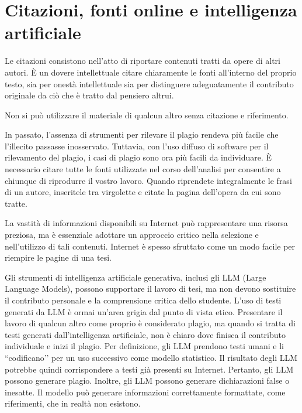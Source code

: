\documentclass{article}
\newcounter{nota}
\begin{document}
\section{Citazioni, fonti online e intelligenza artificiale}
Le citazioni consistono nell’atto di riportare contenuti tratti da opere di altri autori. È un dovere intellettuale citare chiaramente le fonti all’interno del proprio testo, sia per onestà intellettuale sia per distinguere adeguatamente il contributo originale da ciò che è tratto dal pensiero altrui.

\begin{nota} Non si può utilizzare il materiale di qualcun altro senza citazione e riferimento. \end{nota}

In passato, l’assenza di strumenti per rilevare il plagio rendeva più facile che l’illecito passasse inosservato. Tuttavia, con l’uso diffuso di software per il rilevamento del plagio, i casi di plagio sono ora più facili da individuare. È necessario citare tutte le fonti utilizzate nel corso dell’analisi per consentire a chiunque di riprodurre il vostro lavoro. Quando riprendete integralmente le frasi di un autore, inseritele tra virgolette e citate la pagina dell’opera da cui sono tratte.

La vastità di informazioni disponibili su Internet può rappresentare una risorsa preziosa, ma è essenziale adottare un approccio critico nella selezione e nell’utilizzo di tali contenuti. Internet è spesso sfruttato come un modo facile per riempire le pagine di una tesi.

Gli strumenti di intelligenza artificiale generativa, inclusi gli LLM (Large Language Models), possono supportare il lavoro di tesi, ma non devono sostituire il contributo personale e la comprensione critica dello studente. L’uso di testi generati da LLM è ormai un’area grigia dal punto di vista etico. Presentare il lavoro di qualcun altro come proprio è considerato plagio, ma quando si tratta di testi generati dall’intelligenza artificiale, non è chiaro dove finisca il contributo individuale e inizi il plagio. Per definizione, gli LLM prendono testi umani e li ``codificano’’ per un uso successivo come modello statistico. Il risultato degli LLM potrebbe quindi corrispondere a testi già presenti su Internet. Pertanto, gli LLM possono generare plagio. Inoltre, gli LLM possono generare dichiarazioni false o inesatte. Il modello può generare informazioni correttamente formattate, come riferimenti, che in realtà non esistono.
\end{document}
